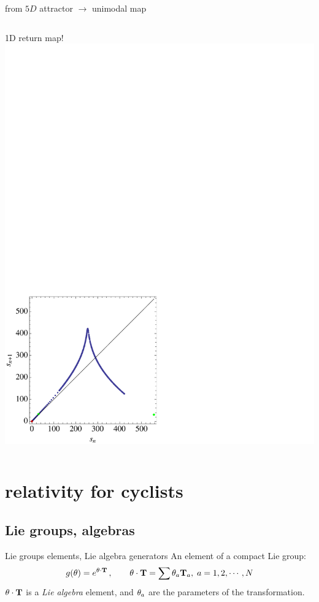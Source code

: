 \documentclass{beamer}
\begin{document}
\begin{frame}{from {\cLf} $5D$ attractor $\to$ unimodal map}
\begin{columns}[t]
{\begin{exampleblock}{1D return map!}
        \includegraphics[width=\textwidth,clip=true]
                        {../../figs/CLEipRM}
		\end{exampleblock}
        }
	\end{columns}
\end{frame}

\section[relativity for cyclists]{relativity for cyclists}

\subsection[Lie groups, algebras]{Lie groups, algebras}

\begin{frame}{Lie groups elements, Lie algebra generators}
An element of a compact Lie group:
\[
g({\bf \theta})=e^{{\bf \theta} \cdot \mathbf{T} }
	\,,\qquad
{\bf \theta} \cdot \mathbf{T}  = \sum {\bf \theta}_a \mathbf{T}_a,\; a=1,2, \cdots, N
\] %
${\bf \theta} \cdot \mathbf{T}$
is a {\em Lie algebra} element,  and ${\bf \theta}_a$ are the parameters
of the transformation.

\end{frame}
\end{document}
